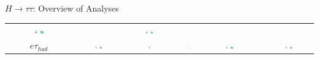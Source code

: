 \documentclass{beamer}
\begin{document}
\begin{frame}{$H \rightarrow \tau \tau$: Overview of Analyses}
\begin{table}
\begin{tabular}{c | c | c | c | c | c | c}
			\includegraphics[width=0.05\textwidth]{figures/atlas_logo.pdf} \includegraphics[width=0.05\textwidth]{figures/cms_logo.pdf} &
			&
			\includegraphics[width=0.05\textwidth]{figures/atlas_logo.pdf} \includegraphics[width=0.05\textwidth]{figures/cms_logo.pdf} 	
			\\	
			$e \tau_{had}$ &
			\includegraphics[width=0.05\textwidth]{figures/atlas_logo.pdf} \includegraphics[width=0.05\textwidth]{figures/cms_logo.pdf} &
			\includegraphics[width=0.05\textwidth]{figures/atlas_logo.pdf} &
			\includegraphics[width=0.05\textwidth]{figures/cms_logo.pdf} &
			\includegraphics[width=0.05\textwidth]{figures/atlas_logo.pdf} \includegraphics[width=0.05\textwidth]{figures/cms_logo.pdf} &
			&
			\includegraphics[width=0.05\textwidth]{figures/atlas_logo.pdf} \includegraphics[width=0.05\textwidth]{figures/cms_logo.pdf} 	
			\\	
			

\end{tabular}
\end{table}
\end{frame}
\end{document}
